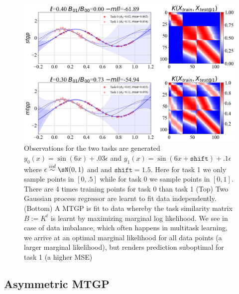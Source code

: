\documentclass[11pt]{article}
\begin{document}
\begin{center} 
\begin{figure}[h!]
    \includegraphics[width=\textwidth]{assets/plt_mtgp_competitive.png}
    \caption{Observations for the two tasks are generated $y_0(x)=\sin(6x) + .03 \epsilon$ and $y_1(x)=\sin(6x + \texttt{shift}) + .1 \epsilon$ where $\epsilon\overset{iid}{\sim} \sN(0,1)$ and  and $\texttt{shift}=1.5$. Here for task 1 we only sample points in $[0,.5]$ while for task 0 we sample points in $[0,1]$. There are 4 times training points for task 0 than task 1 (Top) Two Gaussian process regressor are learnt to fit data independently. (Bottom) A MTGP is fit to data whereby the task similarity matrix $B:=K^t$ is learnt by maximizing marginal log likelihood. We see in case of data imbalance, which often happens in multitask learning, we arrive at an optimal marginal likelihood for all data points (a larger marginal likelihood), but renders prediction suboptimal for task 1 (a higher MSE)}
    \label{fig:plt_mtgp_competitive}
\end{figure}
\end{center} 

    

\subsection{Asymmetric MTGP}
\end{document}
